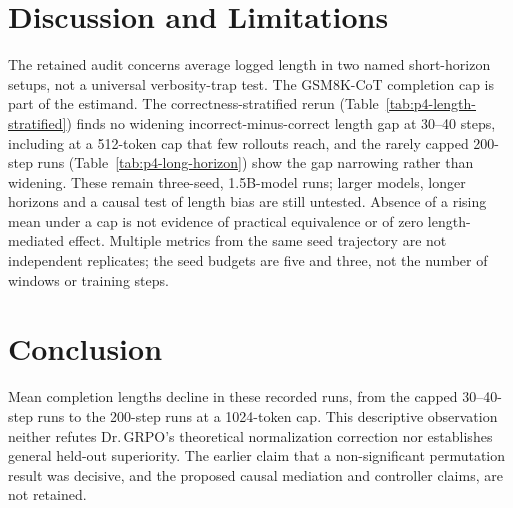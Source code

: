 \section{Discussion and Limitations}
\label{sec:p4-discussion}
The retained audit concerns average logged length in two named short-horizon
setups, not a universal verbosity-trap test. The GSM8K-CoT completion cap is
part of the estimand. The correctness-stratified rerun
(Table~\ref{tab:p4-length-stratified}) finds no widening incorrect-minus-correct
length gap at 30--40 steps, including at a 512-token cap that few rollouts
reach, and the rarely capped 200-step runs (Table~\ref{tab:p4-long-horizon}) show
the gap narrowing rather than widening. These remain three-seed, 1.5B-model
runs; larger models, longer horizons and a causal test of length bias are
still untested. Absence of
a rising mean under a cap is not evidence of practical equivalence or of
zero length-mediated effect. Multiple metrics from the same seed trajectory
are not independent replicates; the seed budgets are five and three, not
the number of windows or training steps.

\section{Conclusion}
\label{sec:p4-conclusion}
Mean completion lengths decline in these recorded runs, from the capped
30--40-step runs to the 200-step runs at a 1024-token cap. This descriptive observation neither refutes Dr.\,GRPO's theoretical
normalization correction nor establishes general held-out superiority.
The earlier claim that a non-significant permutation result was decisive,
and the proposed causal mediation and controller claims, are not retained.
